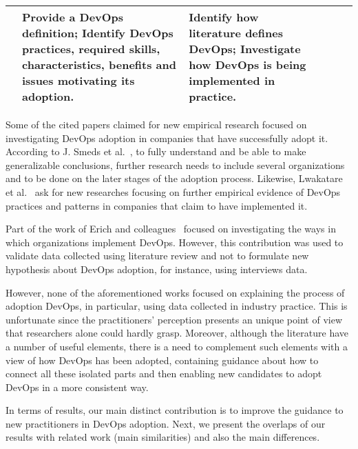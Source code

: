 \begin{table*}[t]
\begin{tabular}{|p{1.7cm}|p{2.72cm}|p{2.72cm}|p{2.72cm}|p{2.72cm}|p{2.72cm}|}
&
Provide a DevOps definition;
\newline \newline
Identify DevOps practices, required skills, characteristics, benefits and
issues motivating its adoption.

&
Identify how literature defines DevOps;
\newline \newline
Investigate how DevOps is being implemented in practice.\\ \bottomrule

\end{tabular}
\end{table*}

Some of the cited papers claimed for new empirical research focused on
investigating DevOps adoption in companies that have successfully adopt it.
According to J. Smeds et al.~\cite{devops_a_definition_xp_15}, to fully understand and be able to make
generalizable conclusions, further research needs to include several
organizations and to be done on the later stages of the adoption process.
Likewise, Lwakatare et al.~\cite{extending_dimensions_icsea_16} ask for new researches
focusing on further empirical evidence of DevOps practices and patterns in
companies that claim to have implemented it.

Part of the work of Erich and colleagues~\cite{qualitative_devops_journalsw_17}
focused on investigating the
ways in which organizations implement DevOps. However, this contribution was
used to validate data collected using literature review and not to formulate
new hypothesis about DevOps adoption, for instance, using interviews data.

However, none of the aforementioned works focused on explaining the process of adoption DevOps,
in particular, using data collected in industry practice. This is unfortunate since the
practitioners' perception presents an unique point of view that researchers
alone could hardly grasp. Moreover, although the literature have a number of
useful elements, there is a need to complement such elements with a view of how DevOps has
been adopted, containing guidance about how to connect all these isolated parts
and then enabling new candidates to adopt DevOps in a more consistent way.

In terms of results, our main distinct contribution is to improve the guidance
to new practitioners in DevOps adoption. Next, we present the overlaps of our
results with related work (main similarities) and also the main differences.

